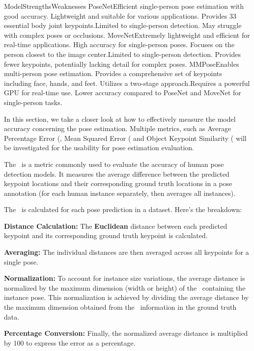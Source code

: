     \setupTABLE[r][1][style=bold]
    \setupTABLE[c][1][style=bold]
    \setupTABLE[c][each][offset=3dd]
    \setupTABLE[frame=off]
    \setupTABLE[r][1][topframe=on,bottomframe=on]
    \setupTABLE[c][each][leftframe=on, align={middle,lohi}]
    \setupTABLE[c][1][leftframe=off]
    \bTR
        \bTD Model\eTD\bTD   Strengths\eTD\bTD Weaknesses\eTD\eTR
    \bTR
        \bTD PoseNet\eTD\bTD Efficient single-person pose estimation with good accuracy. Lightweight and suitable for various applications. Provides 33 essential body joint keypoints.\eTD\bTD Limited to single-person detection. May struggle with complex poses or occlusions.\eTD\eTR
    \bTR
        \bTD MoveNet\eTD\bTD Extremely lightweight and efficient for real-time applications. High accuracy for single-person poses. Focuses on the person closest to the image center.\eTD\bTD Limited to single-person detection. Provides fewer keypoints, potentially lacking detail for complex poses.\eTD\eTR
    \bTR
        \bTD MMPose\eTD\bTD  Enables multi-person pose estimation. Provides a comprehensive set of keypoints including face, hands, and feet. Utilizes a two-stage approach.\eTD\bTD Requires a powerful GPU for real-time use. Lower accuracy compared to PoseNet and MoveNet for single-person tasks.\eTD\eTR

In this section, we take a closer look at how to effectively measure the model accuracy concerning the pose estimation. Multiple metrics, such as Average Percentage Error (\APE\), Mean Squared Error (\MSE\) and Object Keypoint Similarity (\OKS\) will be investigated for the usability for pose estimation evaluation.

The \APE\ is a metric commonly used to evaluate the accuracy of human pose detection models. It measures the average difference between the predicted keypoint locations and their corresponding ground truth locations in a pose annotation (for each human instance separately, then averages all instances).

The \APE\ is calculated for each pose prediction in a dataset. Here's the breakdown:

\startitemize[n]
    \item {\bf Distance Calculation:} The {\bf Euclidean} distance between each predicted keypoint and its corresponding ground truth keypoint is calculated.
    \item {\bf Averaging:} The individual distances are then averaged across all keypoints for a single pose.
    \item {\bf Normalization:} To account for instance size variations, the average distance is normalized by the maximum dimension (width or height) of the \BBOX\ containing the instance pose. This normalization is achieved by dividing the average distance by the maximum dimension obtained from the \BBOX\ information in the ground truth data.
    \item {\bf Percentage Conversion:} Finally, the normalized average distance is multiplied by 100 to express the error as a percentage.
\stopitemize

